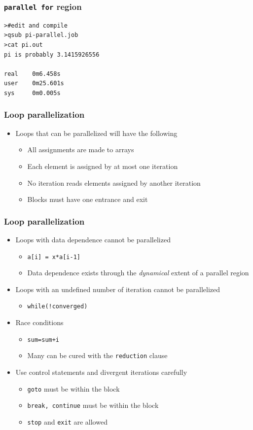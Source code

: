 \documentclass[xcolor=table,10pt,final]{beamer}
\begin{document}
\begin{frame}[fragile]
  \frametitle{{\tt parallel for} region}
  \begin{verbatim}
>#edit and compile 
>qsub pi-parallel.job
>cat pi.out
pi is probably 3.1415926556

real    0m6.458s
user    0m25.601s
sys     0m0.005s
  \end{verbatim}
\end{frame}

\begin{frame}
  \frametitle{Loop parallelization}
  \begin{itemize}
    \item Loops that can be parallelized will have the following
      \begin{itemize}
	\itemsep 0.5cm
	\item All assignments are made to arrays
	\item Each element is assigned by at most one iteration
	\item No iteration reads elements assigned by another iteration
	\item Blocks must have one entrance and exit
      \end{itemize}
  \end{itemize}
\end{frame}


\begin{frame}
  \frametitle{Loop parallelization}
  \begin{itemize}
    \itemsep 0.5cm
    \item Loops with data dependence cannot be parallelized
      \begin{itemize}
	\item {\tt a[i] = x*a[i-1]}
	\item Data dependence exists through the \emph{dynamical} extent of a parallel region
      \end{itemize}
    \item Loops with an undefined number of iteration cannot be parallelized
      \begin{itemize}
	\item {\tt while(!converged)}
      \end{itemize}
    \item Race conditions
      \begin{itemize}
	\item {\tt sum=sum+i}
	\item Many can be cured with the {\tt reduction} clause
      \end{itemize}
    \item Use control statements and divergent iterations carefully
      \begin{itemize}
	\item {\tt goto} must be within the block
	\item {\tt break, continue} must be within the block
	\item {\tt stop} and {\tt exit} are allowed
      \end{itemize}
  \end{itemize}
\end{frame}
\end{document}
